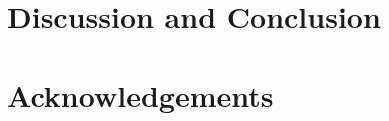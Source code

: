 \documentclass{bmcart}
\begin{document}
\section{Discussion and Conclusion}\label{sec:conclusion}



\section*{Acknowledgements}







\end{document}
